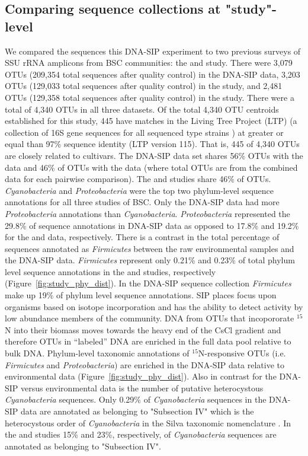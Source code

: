 \subsection{Comparing sequence collections at "study"-level} We compared the
sequences this DNA-SIP experiment to two previous surveys of SSU rRNA
amplicons from BSC communities: the \citet{Garcia_Pichel_2013} and
\citet{Steven_2013} study. There were 3,079 OTUs (209,354 total sequences after
quality control) in the DNA-SIP data, 3,203 OTUs (129,033 total sequences after
quality control) in the \citet{Garcia_Pichel_2013} study, and 2,481 OTUs
(129,358 total sequences after quality control) in the \citet{Steven_2013}
study. There were a total of 4,340 OTUs in all three datasets. Of the total
4,340 OTU centroids established for this study, 445 have matches in the Living
Tree Project (LTP) (a collection of 16S gene sequences for all sequenced type
strains \citep{Yarza_2008}) at greater or equal than 97\% sequence identity
(LTP version 115). That is, 445 of 4,340 OTUs are closely related to cultivars.
The DNA-SIP data set shares 56\% OTUs with the \citet{Steven_2013} data and
46\% of OTUs with the \citet{Garcia_Pichel_2013} data (where total OTUs are
from the combined data for each pairwise comparison).  The \citet{Steven_2013}
and \citet{Garcia_Pichel_2013} studies share 46\% of OTUs.
\textit{Cyanobacteria} and \textit{Proteobacteria} were the top two
phylum-level sequence annotations for all three studies of BSC. Only the
DNA-SIP data had more \textit{Proteobacteria} annotations than
\textit{Cyanobacteria}.  \textit{Proteobacteria} represented the 29.8\% of
sequence annotations in DNA-SIP data as opposed to 17.8\% and 19.2\% for the
\citet{Garcia_Pichel_2013} and \citet{Steven_2013} data, respectively.  There
is a contrast in the total percentage of sequences annotated as
\textit{Firmicutes} between the raw environmental samples and the DNA-SIP data.
\textit{Firmicutes} represent only 0.21\% and 0.23\% of total phylum level
sequence annotations in the \citet{Steven_2013} and \citet{Garcia_Pichel_2013}
studies, respectively (Figure~\ref{fig:study_phy_dist}). In the DNA-SIP
sequence collection \textit{Firmicutes} make up 19\% of phylum level sequence
annotations. SIP places focus upon organisms based on isotope incorporation and
has the ability to detect activity by low abundance members of the community.
DNA from OTUs that incopororate $^{15}$N into their biomass moves towards the
heavy end of the CsCl gradient and therefore OTUs in ``labeled'' DNA are
enriched in the full data pool relative to bulk DNA.  Phylum-level taxonomic
annotations of $^{15}$N-responsive OTUs (i.e. \textit{Firmicutes} and
\textit{Proteobacteria}) are enriched in the DNA-SIP data relative to
environmental data (Figure~\ref{fig:study_phy_dist}). Also in contrast
for the DNA-SIP versus environmental data is the number of putative
heterocystous \textit{Cyanobacteria} sequences. Only 0.29\% of
\textit{Cyanobacteria} sequences in the DNA-SIP data are annotated as belonging
to "Subsection IV" which is the heterocystous order of \textit{Cyanobacteria}
in the Silva taxonomic nomenclature \citep{17947321}. In the
\citet{Steven_2013} and \citet{Garcia_Pichel_2013} studies 15\% and 23\%,
respectively, of \textit{Cyanobacteria} sequences are annotated as belonging to
"Subsection IV".
